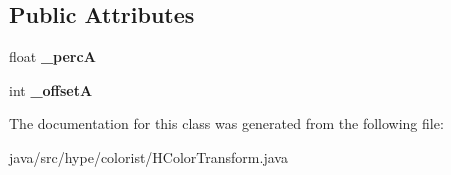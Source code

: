 \subsection*{Public Attributes}
\begin{DoxyCompactItemize}
\item 
\hypertarget{classhype_1_1colorist_1_1_h_color_transform_aff98c3552490d02a099258f393a99781}{float {\bfseries \-\_\-perc\-A}}\label{classhype_1_1colorist_1_1_h_color_transform_aff98c3552490d02a099258f393a99781}

\item 
\hypertarget{classhype_1_1colorist_1_1_h_color_transform_aee4e808255a2c3e3d10980da4c2cc71e}{int {\bfseries \-\_\-offset\-A}}\label{classhype_1_1colorist_1_1_h_color_transform_aee4e808255a2c3e3d10980da4c2cc71e}

\end{DoxyCompactItemize}


The documentation for this class was generated from the following file\-:\begin{DoxyCompactItemize}
\item 
java/src/hype/colorist/H\-Color\-Transform.\-java\end{DoxyCompactItemize}

